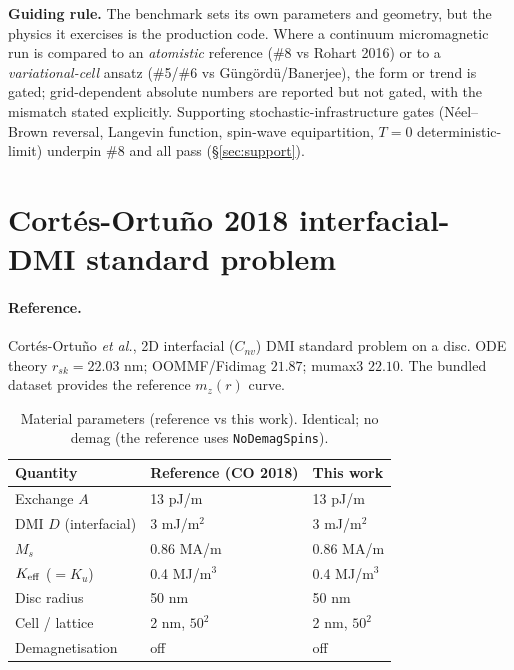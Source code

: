 \documentclass[11pt]{article}
\begin{document}
\noindent
\textbf{Guiding rule.} The benchmark sets its own parameters and
geometry, but the physics it exercises is the production code.
Where a continuum micromagnetic run is compared to an
\emph{atomistic} reference (\#8 vs Rohart 2016) or to a
\emph{variational-cell} ansatz (\#5/\#6 vs G\"ung\"ord\"u/Banerjee),
the form or trend is gated; grid-dependent absolute numbers are
reported but not gated, with the mismatch stated explicitly.
Supporting stochastic-infrastructure gates (N\'eel--Brown reversal,
Langevin function, spin-wave equipartition, $T{=}0$
deterministic-limit) underpin \#8 and all pass (\S\ref{sec:support}).

\clearpage
\section{Cort\'es-Ortu\~no 2018 interfacial-DMI standard problem}
\label{sec:co}

\paragraph{Reference.} Cort\'es-Ortu\~no \emph{et al.}, 2D
interfacial ($C_{nv}$) DMI standard problem on a disc. ODE theory
$r_{sk}=22.03$ nm; OOMMF/Fidimag $21.87$; mumax3 $22.10$. The
bundled dataset provides the reference $m_z(r)$ curve.

\begin{table}[htbp]
\centering
\caption{Material parameters (reference vs this work). Identical;
no demag (the reference uses \texttt{NoDemagSpins}).}
\begin{tabular}{@{}lll@{}}
\toprule
Quantity & Reference (CO 2018) & This work \\
\midrule
Exchange $A$            & 13 pJ/m       & 13 pJ/m \\
DMI $D$ (interfacial)   & 3 mJ/m$^2$    & 3 mJ/m$^2$ \\
$M_s$                   & 0.86 MA/m     & 0.86 MA/m \\
$K_{\rm eff}$ ($=K_u$)  & 0.4 MJ/m$^3$  & 0.4 MJ/m$^3$ \\
Disc radius             & 50 nm         & 50 nm \\
Cell / lattice          & 2 nm, $50^2$  & 2 nm, $50^2$ \\
Demagnetisation         & off           & off \\
\bottomrule
\end{tabular}
\end{table}
\end{document}
